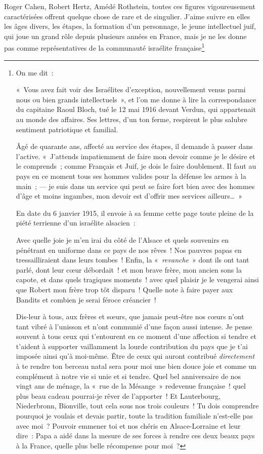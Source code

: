 \documentclass[french,twoside]{book} %
\begin{document}
Roger Cahen, Robert Hertz, Amédé Rothstein, toutes ces figures vigoureusement caractérisées offrent quelque chose de rare et de singulier. J’aime suivre en elles les âges divers, les étapes, la formation d’un personnage, le jeune intellectuel juif, qui joue un grand rôle depuis plusieurs années en France, mais je ne les donne pas comme représentatives de la communauté israélite française\footnote{\noindent On me dit :‌\par
 « Vous avez fait voir des Israélites d’exception, nouvellement venus parmi nous ou bien grands intellectuels », et l’on me donne à lire la correspondance du capitaine Raoul Bloch, tué le 12 mai 1916 devant Verdun, qui appartenait au monde des affaires. Ses lettres, d’un ton ferme, respirent le plus salubre sentiment patriotique et familial.‌\par
 Âgé de quarante ans, affecté au service des étapes, il demande à passer dans l’active. « J’attends impatiemment de faire mon devoir comme je le désire et le comprends ; comme Français et Juif, je dois le faire doublement. Il faut au pays en ce moment tous ses hommes valides pour la défense les armes à la main ; — je suis dans un service qui peut se faire fort bien avec des hommes d’âge et moins ingambes, mon devoir est d’offrir mes services ailleurs… »‌\par
 En date du 6 janvier 1915, il envoie à sa femme cette page toute pleine de la piété terrienne d’un israélite alsacien :‌\par
  \noindent Avec quelle joie je m’en irai du côté de l’Alsace et quels souvenirs en pénétrant en uniforme dans ce pays de nos rêves ! Nos pauvres papas en tressailliraient dans leurs tombes ! Enfin, la « {\itshape revanche} » dont ils ont tant parlé, dont leur cœur débordait ! et mon brave frère, mon ancien sons la capote, et dans quels tragiques moments ! avec quel plaisir je le vengerai ainsi que Robert mon frère trop tôt disparu ! Quelle note à faire payer aux Bandits et combien je serai féroce créancier !‌
 \par
 \noindent Dis-leur à tous, aux frères et sœurs, que jamais peut-être nos cœurs n’ont tant vibré à l’unisson et n’ont communié d’une façon aussi intense. Je pense souvent à tous ceux qui t’entourent en ce moment d’une affection si tendre et t’aident à supporter vaillamment la lourde contribution du pays que je t’ai imposée ainsi qu’à moi-même. Être de ceux qui auront contribué {\itshape directement} à te rendre ton berceau natal sera pour moi une bien douce joie et comme un complément à notre vie si unie et si tendre. Quel bel anniversaire de nos vingt ans de ménage, la « rue de la Mésange » redevenue française ! quel plus beau cadeau pourrai-je rêver de l’apporter ! Et Lauterbourg, Niederbronn, Bionville, tout cela sous nos trois couleurs ! Tu dois comprendre pourquoi je voulais et devais partir, toute la tradition familiale n’est-elle pas avec moi ? Pouvoir emmener toi et nos chéris en Alsace-Lorraine et leur dire : Papa a aidé dans la mesure de ses forces à rendre ces deux beaux pays à la France, quelle plus belle récompense pour moi ?
}
\end{document}
